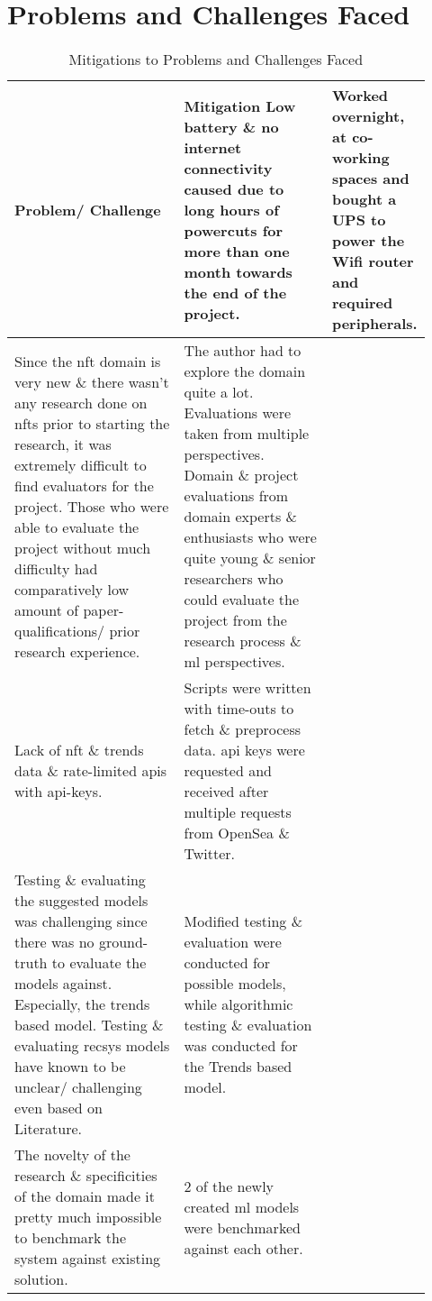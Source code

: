 \section{Problems and Challenges Faced}

\vspace{-4mm}
\begin{longtable}{|p{0.5\linewidth}|p{0.425\linewidth}|}
\caption{Mitigations to Problems and Challenges Faced}\\ 
\hline
\textbf{Problem/ Challenge} & \textbf{Mitigation}\endfirsthead 
\hline
Low battery \& no internet connectivity caused due to long hours of powercuts for more than one month towards the end of the project. & Worked overnight, at co-working spaces and bought a UPS to power the Wifi router and  required peripherals. \\
\hline
Since the \gls{nft} domain is very new \& there wasn't any research done on \gls{nft}s prior to starting the research, it was extremely difficult to find evaluators for the project. Those who were able to evaluate the project without much difficulty had comparatively low amount of paper-qualifications/ prior research experience. & The author had to explore the domain quite a lot. Evaluations were taken from multiple perspectives. Domain \& project evaluations from domain experts \& enthusiasts who were quite young \& senior researchers who could evaluate the project from the research process \& \gls{ml} perspectives. \\
\hline
Lack of \gls{nft} \& trends data \& rate-limited \gls{api}s with \gls{api}-keys. & 
Scripts were written with time-outs to fetch \& preprocess data. \gls{api} keys were requested and received after multiple requests from OpenSea \& Twitter.\\
\hline
Testing \& evaluating the suggested models was challenging since there was no ground-truth to evaluate the models against. Especially, the trends based model. Testing \& evaluating \gls{recsys} models have known to be unclear/ challenging even based on Literature. & Modified testing \& evaluation were conducted for possible models, while algorithmic testing \& evaluation was conducted for the Trends based model. \\
\hline
The novelty of the research \& specificities of the domain made it pretty much impossible to benchmark the system against existing solution. & 2 of the newly created \gls{ml} models were benchmarked against each other. \\
\hline
\end{longtable}

